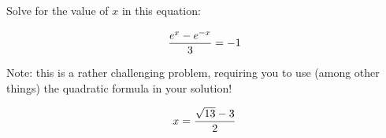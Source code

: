 

Solve for the value of $x$ in this equation:

$${e^x - e^{-x} \over 3} = -1$$

Note: this is a rather challenging problem, requiring you to use (among other things) the quadratic formula in your solution!







$$x = {\sqrt{13} - 3 \over 2}$$











